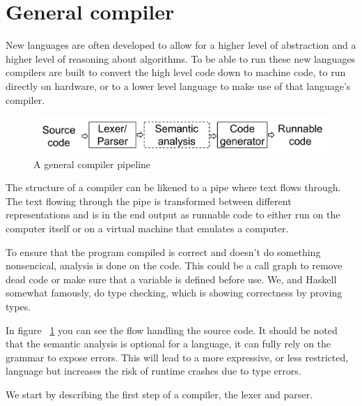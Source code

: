 \section{General compiler}
New languages are often developed to allow for a higher level of abstraction and a higher level of reasoning about algorithms. To be able to run these new languages compilers are built to convert the high level code down to machine code, to run directly on hardware, or to a lower level language to make use of that language's compiler. 

\begin{figure}[h!]
  \centering
  \includegraphics[width=0.6\pdfpagewidth]{figure/generalpipeline}
  \caption{A general compiler pipeline}
  \label{fig:generalpipeline}
\end{figure}

The structure of a compiler can be likened to a pipe where text flows through. 
The text flowing through the pipe is transformed between different representations and is in
the end output as runnable code to either run on the computer itself or on a virtual machine
that emulates a computer. 

To ensure that the program compiled is correct and doesn't do something nonsencical, analysis is done on the code. This could be a call graph to remove dead code or make sure that a variable is defined before use. We, and Haskell somewhat famously, do type checking, which is showing correctness by proving types.

In figure ~\ref{fig:generalpipeline} you can see the flow handling the source code.
It should be noted that the semantic analysis is optional for a language, it can
fully rely on the grammar to expose errors. This will lead to a more expressive, 
or less restricted, language but increases the risk of runtime crashes due to type errors.

We start by describing the first step of a compiler, the lexer and parser.
